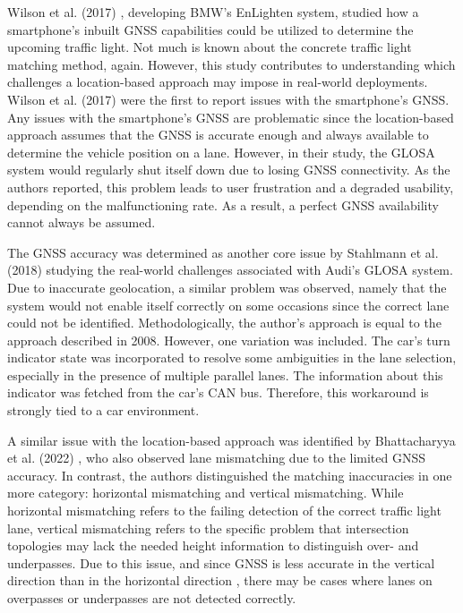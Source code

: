 Wilson et al. (2017) \cite{wilson_driver_2017}, developing BMW's EnLighten system, studied how a smartphone's inbuilt GNSS capabilities could be utilized to determine the upcoming traffic light. Not much is known about the concrete traffic light matching method, again. However, this study contributes to understanding which challenges a location-based approach may impose in real-world deployments. Wilson et al. (2017) \cite{wilson_driver_2017} were the first to report issues with the smartphone's GNSS. Any issues with the smartphone's GNSS are problematic since the location-based approach assumes that the GNSS is accurate enough and always available to determine the vehicle position on a lane. However, in their study, the GLOSA system would regularly shut itself down due to losing GNSS connectivity. As the authors reported, this problem leads to user frustration and a degraded usability, depending on the malfunctioning rate. As a result, a perfect GNSS availability cannot always be assumed. 

The GNSS accuracy was determined as another core issue by Stahlmann et al. (2018) \cite{stahlmann_exploring_2018} studying the real-world challenges associated with Audi's GLOSA system. Due to inaccurate geolocation, a similar problem was observed, namely that the system would not enable itself correctly on some occasions since the correct lane could not be identified. Methodologically, the author's approach is equal to the approach described in 2008. However, one variation was included. The car's turn indicator state was incorporated to resolve some ambiguities in the lane selection, especially in the presence of multiple parallel lanes. The information about this indicator was fetched from the car's CAN bus. Therefore, this workaround is strongly tied to a car environment.

A similar issue with the location-based approach was identified by Bhattacharyya et al. (2022) \cite{bhattacharyya_assessing_2022}, who also observed lane mismatching due to the limited GNSS accuracy. In contrast, the authors distinguished the matching inaccuracies in one more category: horizontal mismatching and vertical mismatching. While horizontal mismatching refers to the failing detection of the correct traffic light lane, vertical mismatching refers to the specific problem that intersection topologies may lack the needed height information to distinguish over- and underpasses. Due to this issue, and since GNSS is less accurate in the vertical direction than in the horizontal direction \cite{khomsin_accuracy_2019}, there may be cases where lanes on overpasses or underpasses are not detected correctly.

